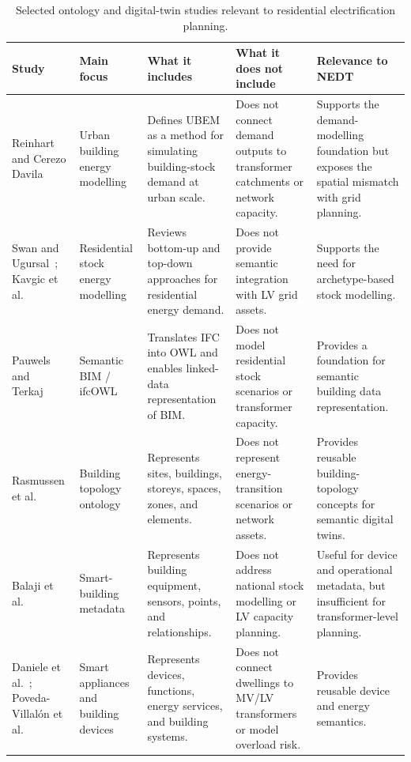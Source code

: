 \documentclass[preprint,12pt]{elsarticle}
\begin{document}
\begin{table}[H]
\centering
\caption{Selected ontology and digital-twin studies relevant to residential
electrification planning.}
\label{tab:selected_literature}
\scriptsize
\setlength{\tabcolsep}{3pt}
\renewcommand{\arraystretch}{1.2}
\begin{tabularx}{\textwidth}{P{2.8cm}P{2.8cm}P{3.2cm}P{3.2cm}P{3.2cm}}
\toprule
\textbf{Study} & \textbf{Main focus} & \textbf{What it includes} &
\textbf{What it does not include} & \textbf{Relevance to NEDT} \\
\midrule

Reinhart and Cerezo Davila~\cite{reinhart_urban_2016} &
Urban building energy modelling &
Defines UBEM as a method for simulating building-stock demand at urban
scale. &
Does not connect demand outputs to transformer catchments or network
capacity. &
Supports the demand-modelling foundation but exposes the spatial mismatch
with grid planning. \\

Swan and Ugursal~\cite{swan_modeling_2009};
Kavgic et al.~\cite{kavgic_review_2010} &
Residential stock energy modelling &
Reviews bottom-up and top-down approaches for residential energy demand. &
Does not provide semantic integration with LV grid assets. &
Supports the need for archetype-based stock modelling. \\

Pauwels and Terkaj~\cite{pauwels_express_2016} &
Semantic BIM / ifcOWL &
Translates IFC into OWL and enables linked-data representation of BIM. &
Does not model residential stock scenarios or transformer capacity. &
Provides a foundation for semantic building data representation. \\

Rasmussen et al.~\cite{rasmussen_bot_2020} &
Building topology ontology &
Represents sites, buildings, storeys, spaces, zones, and elements. &
Does not represent energy-transition scenarios or network assets. &
Provides reusable building-topology concepts for semantic digital twins. \\

Balaji et al.~\cite{balaji_brick_2018} &
Smart-building metadata &
Represents building equipment, sensors, points, and relationships. &
Does not address national stock modelling or LV capacity planning. &
Useful for device and operational metadata, but insufficient for
transformer-level planning. \\

Daniele et al.~\cite{daniele_saref_2015};
Poveda-Villalón et al.~\cite{poveda-villalon_chowlk_2020} &
Smart appliances and building devices &
Represents devices, functions, energy services, and building systems. &
Does not connect dwellings to MV/LV transformers or model overload risk. &
Provides reusable device and energy semantics. \\


\end{tabularx}
\end{table}
\end{document}
